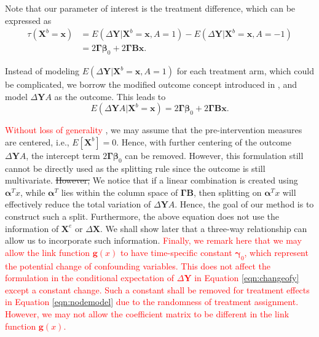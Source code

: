 \documentclass[smallextended]{svjour3}
\newcommand{\bg}[1]{\textcolor{red}{#1}}
\begin{document}
Note that our parameter of interest is the treatment difference, which can be expressed as
\begin{align}
    \tau( \bm X^b = \bm{x}) &= E(\Delta \bm{Y}|\bm X^b = \bm x, A = 1) - E(\Delta \bm{Y}|\bm X^b = \bm x, A = -1) \nonumber \\
    &= 2 \bm \Gamma \boldsymbol \beta_0 + 2 \bm \Gamma \bm B \bm x. \label{eqn:treatmenteffect}
\end{align}

Instead of modeling $E(\Delta \bm{Y}|\bm X^b = \bm x, A = 1)$ for each treatment arm, which could be complicated, we borrow the modified outcome concept introduced in \cite{tian2014simple}, and model $\Delta \bm{Y} A$ as the outcome. This leads to
\begin{equation}
E(\Delta \bm Y A | \bm X^b = \bm x) = 2 \bm \Gamma \boldsymbol \beta_0 + 2 \bm \Gamma \bm B \bm x. \label{eqn:nodemodel}
\end{equation}

\bg{Without loss of generality} , we may assume that the pre-intervention measures are centered, i.e., $E[\bm X^b] = 0$. Hence, with further centering of the outcome $\Delta \bm Y A$, the intercept term $2 \bm \Gamma \boldsymbol \beta_0$ can be removed. However, this formulation still cannot be directly used as the splitting rule since the outcome is still multivariate. \st{However, } We notice that if a linear combination is created using $\bm \alpha^T x$, while $\bm \alpha^T$ lies within the column space of $\bm \Gamma \bm B$, then splitting on $\bm \alpha^T x$ will effectively reduce the total variation of $\Delta \bm Y A$. Hence, the goal of our method is to construct such a split. Furthermore, the above equation does not use the information of $\bm X^e$ or $\Delta \bm X$. We shall show later that a three-way relationship can allow us to incorporate such information. \bg{Finally, we remark here that we may allow the link function $\bm g(x)$ to have time-specific constant $\bm \gamma_0$, which represent the potential change of confounding variables. This does not affect the formulation in the conditional expectation of $\Delta \bm Y$ in Equation \eqref{eqn:changeofy} except a constant change. Such a constant shall be removed for treatment effects in Equation \eqref{eqn:nodemodel} due to the randomness of treatment assignment. However, we may not allow the coefficient matrix to be different in the link function $\bm g(x)$.}
\end{document}
